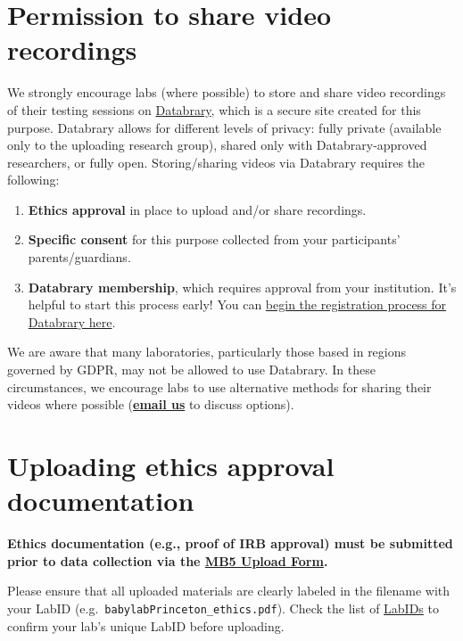 \documentclass[
  letterpaper,
  DIV=11,
  numbers=noendperiod,
  oneside]{scrreprt}
\providecommand{\tightlist}{%
  \setlength{\itemsep}{0pt}\setlength{\parskip}{0pt}}
\begin{document}
\section{Permission to share video
recordings}\label{permission-to-share-video-recordings}

We strongly encourage labs (where possible) to store and share video
recordings of their testing sessions on
\href{https://nyu.databrary.org/}{Databrary}, which is a secure site
created for this purpose. Databrary allows for different levels of
privacy: fully private (available only to the uploading research group),
shared only with Databrary-approved researchers, or fully open.
Storing/sharing videos via Databrary requires the following:

\begin{enumerate}
\def\labelenumi{(\arabic{enumi})}
\setcounter{enumi}{15}
\tightlist
\item
  \textbf{Ethics approval} in place to upload and/or share recordings.
\item
  \textbf{Specific consent} for this purpose collected from your
  participants' parents/guardians.
\item
  \textbf{Databrary membership}, which requires approval from your
  institution. It's helpful to start this process early! You can
  \href{https://nyu.databrary.org/user/register?page=create}{begin the
  registration process for Databrary here}.
\end{enumerate}

We are aware that many laboratories, particularly those based in regions
governed by GDPR, may not be allowed to use Databrary. In these
circumstances, we encourage labs to use alternative methods for sharing
their videos where possible
(\href{mailto:mb5@manybabies.org}{\textbf{email us}} to discuss
options).

\section{Uploading ethics approval documentation}\label{ethics-upload}

\textbf{Ethics documentation (e.g., proof of IRB approval) must be
submitted prior to data collection via the
\href{https://airtable.com/appRoqMKzcK3NsXt4/pagPm3MXnFExsz1Ti/form}{MB5
Upload Form}.}

Please ensure that all uploaded materials are clearly labeled in the
filename with your LabID (e.g.~\texttt{babylabPrinceton\_ethics.pdf}).
Check the list of \href{https://manybabies.org/labids/}{LabIDs} to
confirm your lab's unique LabID before uploading.
\end{document}
